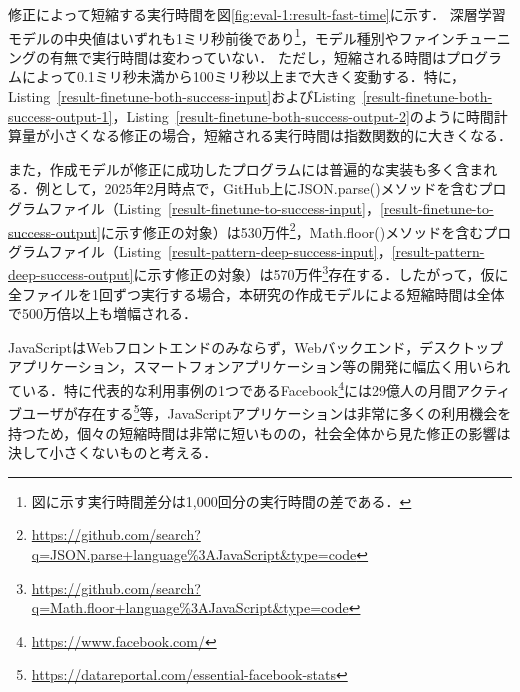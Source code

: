 \documentclass[11pt]{jreport}
\newcommand{\fixtwo}[1]{#1}
\begin{document}
修正によって短縮する実行時間を図\ref{fig:eval-1:result-fast-time}に示す．
深層学習モデルの中央値はいずれも1ミリ秒前後であり\footnote{図に示す実行時間差分は1,000回分の実行時間の差である．}，モデル種別やファインチューニングの有無で実行時間は変わっていない．
\fixtwo{ただし，短縮される時間はプログラムによって0.1ミリ秒未満から100ミリ秒以上まで大きく変動する．特に，Listing~\ref{result-finetune-both-success-input}およびListing~\ref{result-finetune-both-success-output-1}，Listing~\ref{result-finetune-both-success-output-2}のように時間計算量が小さくなる修正の場合，短縮される実行時間は指数関数的に大きくなる．}

\fixtwo{また，作成モデルが修正に成功したプログラムには普遍的な実装も多く含まれる．例として，2025年2月時点で，GitHub上にJSON.parse()メソッドを含むプログラムファイル（Listing~\ref{result-finetune-to-success-input}，\ref{result-finetune-to-success-output}に示す修正の対象）は530万件\footnote{\url{https://github.com/search?q=JSON.parse+language\%3AJavaScript&type=code}}，Math.floor()メソッドを含むプログラムファイル（Listing~\ref{result-pattern-deep-success-input}，\ref{result-pattern-deep-success-output}に示す修正の対象）は570万件\footnote{\url{https://github.com/search?q=Math.floor+language\%3AJavaScript&type=code}}存在する．したがって，仮に全ファイルを1回ずつ実行する場合，本研究の作成モデルによる短縮時間は全体で500万倍以上も増幅される．}

\fixtwo{JavaScriptはWebフロントエンドのみならず，Webバックエンド，デスクトップアプリケーション，スマートフォンアプリケーション等の開発に幅広く用いられている．特に代表的な利用事例の1つであるFacebook\footnote{\url{https://www.facebook.com/}}には29億人の月間アクティブユーザが存在する\footnote{\url{https://datareportal.com/essential-facebook-stats}}等，JavaScriptアプリケーションは非常に多くの利用機会を持つため，個々の短縮時間は非常に短いものの，社会全体から見た修正の影響は決して小さくないものと考える．}
\end{document}
